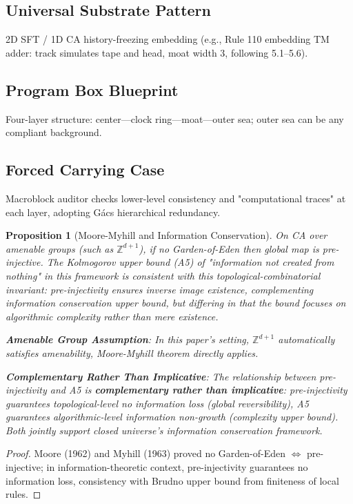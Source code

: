 \documentclass[12pt]{article}
\theoremstyle{plain}
\newtheorem{proposition}[theorem]{Proposition}
\theoremstyle{definition}
\begin{document}
\subsection{Universal Substrate Pattern}

2D SFT / 1D CA history-freezing embedding (e.g., Rule 110 embedding TM adder: track simulates tape and head, moat width 3, following 5.1--5.6).

\subsection{Program Box Blueprint}

Four-layer structure: center---clock ring---moat---outer sea; outer sea can be any compliant background.

\subsection{Forced Carrying Case}

Macroblock auditor checks lower-level consistency and "computational traces" at each layer, adopting G\'{a}cs hierarchical redundancy\cite{gacs2001}.

\begin{proposition}[Moore-Myhill and Information Conservation]
On CA over amenable groups (such as $\mathbb{Z}^{d+1}$), if no Garden-of-Eden then global map is pre-injective. The Kolmogorov upper bound (A5) of "information not created from nothing" in this framework is consistent with this topological-combinatorial invariant: pre-injectivity ensures inverse image existence, complementing information conservation upper bound, but differing in that the bound focuses on algorithmic complexity rather than mere existence.

\textbf{Amenable Group Assumption}: In this paper's setting, $\mathbb{Z}^{d+1}$ automatically satisfies amenability, Moore-Myhill theorem\cite{moore1962,myhill1963} directly applies.

\textbf{Complementary Rather Than Implicative}: The relationship between pre-injectivity and A5 is \textbf{complementary rather than implicative}: pre-injectivity guarantees topological-level no information loss (global reversibility), A5 guarantees algorithmic-level information non-growth (complexity upper bound). Both jointly support closed universe's information conservation framework.
\end{proposition}

\begin{proof}
Moore (1962) and Myhill (1963) proved no Garden-of-Eden $\Leftrightarrow$ pre-injective; in information-theoretic context, pre-injectivity guarantees no information loss, consistency with Brudno upper bound from finiteness of local rules.
\end{proof}
\end{document}
